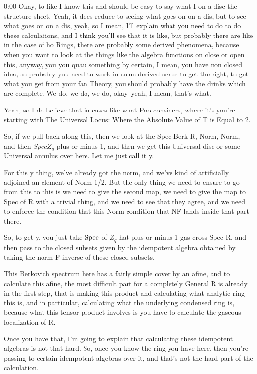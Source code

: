 \begin{unfinished}{0:00}
Okay, to like I know this and should be easy to say what I on a disc the structure sheet. Yeah, it does reduce to seeing what goes on on a dis, but to see what goes on on a dis, yeah, so I mean, I'll explain what you need to do to do these calculations, and I think you'll see that it is like, but probably there are like in the case of ho Rings, there are probably some derived phenomena, because when you want to look at the things like the algebra functions on close or open this, anyway, you you quau something by certain, I mean, you have non closed idea, so probably you need to work in some derived sense to get the right, to get what you get from your fan Theory, you should probably have the drinks which are complete. We do, we do, we do, okay, yeah, I mean, that's what.

Yeah, so I do believe that in cases like what Poo considers, where it's you're starting with
The Universal Locus: Where the Absolute Value of T is Equal to 2.

So, if we pull back along this, then we look at the Spec Berk R, Norm, Norm, and then $Spec Z_q$ plus or minus 1, and then we get this Universal disc or some Universal annulus over here. Let me just call it y.

For this y thing, we've already got the norm, and we've kind of artificially adjoined an element of Norm 1/2. But the only thing we need to ensure to go from this to this is we need to give the second map, we need to give the map to Spec of R with a trivial thing, and we need to see that they agree, and we need to enforce the condition that this Norm condition that NF lands inside that part there.

So, to get y, you just take $\operatorname{Spec}$ of $Z_q$ hat plus or minus 1 gas cross Spec R, and then pass to the closed subsets given by the idempotent algebra obtained by taking the norm F inverse of these closed subsets.

This Berkovich spectrum here has a fairly simple cover by an afine, and to calculate this afine, the most difficult part for a completely General R is already in the first step, that is making this product and calculating what analytic ring this is, and in particular, calculating what the underlying condensed ring is, because what this tensor product involves is you have to calculate the gaseous localization of R.

Once you have that, I'm going to explain that calculating these idempotent algebras is not that hard. So, once you know the ring you have here, then you're passing to certain idempotent algebras over it, and that's not the hard part of the calculation.


\end{unfinished}
